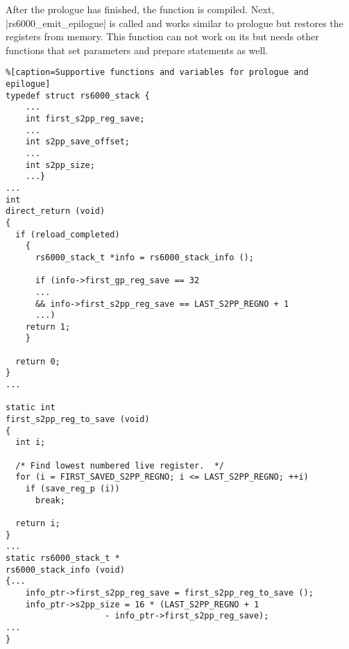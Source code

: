 After the prologue has finished, the function is compiled.
Next, |rs6000_emit_epilogue| is called and works similar to prologue but restores the registers from memory.
This function can not work on its but needs other functions that set parameters and prepare statements as well.
\begin{lstlisting}%[caption=Supportive functions and variables for prologue and epilogue]
typedef struct rs6000_stack {
    ...
    int first_s2pp_reg_save;
    ...
    int s2pp_save_offset;
    ...
    int s2pp_size;
    ...}
...
int
direct_return (void)
{
  if (reload_completed)
    {
      rs6000_stack_t *info = rs6000_stack_info ();

      if (info->first_gp_reg_save == 32
      ...
      && info->first_s2pp_reg_save == LAST_S2PP_REGNO + 1
      ...)
    return 1;
    }

  return 0;
}
...

static int
first_s2pp_reg_to_save (void)
{
  int i;

  /* Find lowest numbered live register.  */
  for (i = FIRST_SAVED_S2PP_REGNO; i <= LAST_S2PP_REGNO; ++i)
    if (save_reg_p (i))
      break;

  return i;
}
...
static rs6000_stack_t *
rs6000_stack_info (void)
{...
    info_ptr->first_s2pp_reg_save = first_s2pp_reg_to_save ();
    info_ptr->s2pp_size = 16 * (LAST_S2PP_REGNO + 1
                    - info_ptr->first_s2pp_reg_save);
...
}
\end{lstlisting}


